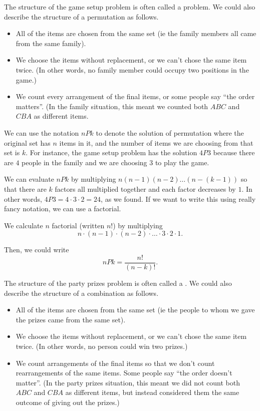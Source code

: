 \documentclass{ximera}
\begin{document}
The structure of the game setup problem is often called a  problem. We could also describe the structure of a permutation as follows.
\begin{itemize}
\item All of the items are chosen from the same set (ie the family members all came from the same family).
\item We choose the items without replacement, or we can't chose the same item twice. (In other words, no family member could occupy two positions in the game.)
\item We count every arrangement of the final items, or some people say ``the order matters''. (In the family situation, this meant we counted both $ABC$ and $CBA$ as different items.
\end{itemize}

We can use the notation $nPk$ to denote the solution of permutation where the original set has $n$ items in it, and the number of items we are choosing from that set is $k$. For instance, the game setup problem has the solution $4P3$ because there are $4$ people in the family and we are choosing $3$ to play the game.

We can evaluate $nPk$ by multiplying $n (n-1)(n-2) \dots (n-(k-1))$ so that there are $k$ factors all multiplied together and each factor decreases by $1$. In other words, $4P3 = 4 \cdot 3 \cdot 2 = 24$, as we found. If we want to write this using really fancy notation, we can use a factorial.
\begin{definition}
We calculate $n$ factorial (written $n!$) by multiplying
\[
n \cdot (n-1) \cdot (n-2) \cdot \dots \cdot 3 \cdot 2 \cdot 1.
\]
\end{definition}
Then, we could write
\[
nPk = \frac{n!}{(n-k)!}.
\]

The structure of the party prizes problem is often called a . We could also describe the structure of a combination as follows.
\begin{itemize}
\item All of the items are chosen from the same set (ie the people to whom we gave the prizes came from the same set).
\item We choose the items without replacement, or we can't chose the same item twice. (In other words, no person  could win two prizes.)
\item We count  arrangements of the final items so that we don't count rearrangements of the same items. Some people say ``the order doesn't matter''. (In the party prizes situation, this meant we did not count both $ABC$ and $CBA$ as different items, but instead considered them the same outcome of giving out the prizes.)
\end{itemize}
\end{document}
